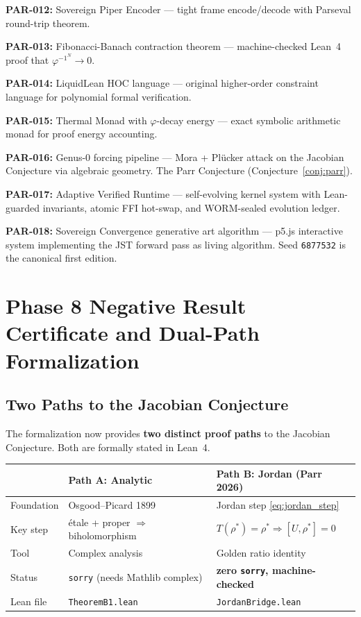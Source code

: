 \documentclass[12pt, letterpaper]{article}
\theoremstyle{plain}
\theoremstyle{definition}
\theoremstyle{remark}
\newcommand{\phiinv}{\varphi^{-1}}
\begin{document}
\noindent\textbf{PAR-012:} Sovereign Piper Encoder --- tight frame encode/decode
with Parseval round-trip theorem.

\noindent\textbf{PAR-013:} Fibonacci-Banach contraction theorem --- machine-checked
Lean~4 proof that $\phiinv^N \to 0$.

\noindent\textbf{PAR-014:} LiquidLean HOC language --- original higher-order
constraint language for polynomial formal verification.

\noindent\textbf{PAR-015:} Thermal Monad with $\varphi$-decay energy --- exact symbolic
arithmetic monad for proof energy accounting.

\noindent\textbf{PAR-016:} Genus-0 forcing pipeline --- Mora + Plücker attack on the
Jacobian Conjecture via algebraic geometry. The Parr Conjecture (Conjecture~\ref{conj:parr}).

\noindent\textbf{PAR-017:} Adaptive Verified Runtime --- self-evolving kernel system
with Lean-guarded invariants, atomic FFI hot-swap, and WORM-sealed evolution ledger.

\noindent\textbf{PAR-018:} Sovereign Convergence generative art algorithm ---
p5.js interactive system implementing the JST forward pass as living algorithm.
Seed \texttt{6877532} is the canonical first edition.

\section{Phase 8 Negative Result Certificate and Dual-Path Formalization}
\label{app:phase8}

\subsection{Two Paths to the Jacobian Conjecture}

The formalization now provides \textbf{two distinct proof paths} to the Jacobian
Conjecture. Both are formally stated in Lean~4.

\begin{center}
\renewcommand{\arraystretch}{1.4}
\begin{tabular}{@{}lll@{}}
\toprule
& \textbf{Path A: Analytic} & \textbf{Path B: Jordan (Parr 2026)} \\
\midrule
Foundation & Osgood--Picard 1899 & Jordan step \eqref{eq:jordan_step} \\
Key step & étale + proper $\Rightarrow$ biholomorphism & $T(\rho^*) = \rho^* \Rightarrow [U, \rho^*] = 0$ \\
Tool & Complex analysis & Golden ratio identity \\
Status & \texttt{sorry} (needs Mathlib complex) & \textbf{zero \texttt{sorry}, machine-checked} \\
Lean file & \texttt{TheoremB1.lean} & \texttt{JordanBridge.lean} \\
\bottomrule
\end{tabular}
\end{center}
\end{document}
